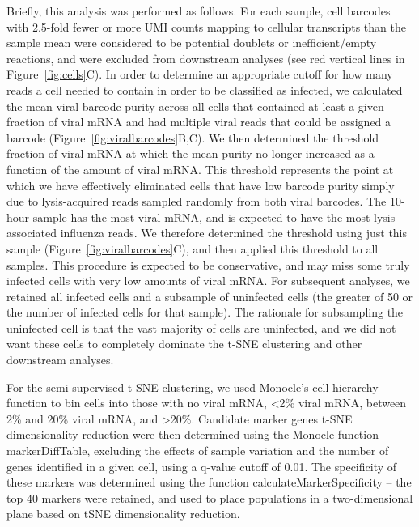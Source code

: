 \documentclass[9pt,lineno]{elife}
\begin{document}
Briefly, this analysis was performed as follows.
For each sample, cell barcodes with 2.5-fold fewer or more UMI counts mapping to cellular transcripts than the sample mean were considered to be potential doublets or inefficient/empty reactions, and were excluded from downstream analyses (see red vertical lines in Figure~\ref{fig:cells}C).
In order to determine an appropriate cutoff for how many reads a cell needed to contain in order to be classified as infected, we calculated the mean viral barcode purity across all cells that contained at least a given fraction of viral mRNA and had multiple viral reads that could be assigned a barcode (Figure~\ref{fig:viralbarcodes}B,C).
We then determined the threshold fraction of viral mRNA at which the mean purity no longer increased as a function of the amount of viral mRNA.
This threshold represents the point at which we have effectively eliminated cells that have low barcode purity simply due to lysis-acquired reads sampled randomly from both viral barcodes.
The 10-hour sample has the most viral mRNA, and is expected to have the most lysis-associated influenza reads.
We therefore determined the threshold using just this sample (Figure~\ref{fig:viralbarcodes}C), and then applied this threshold to all samples.
This procedure is expected to be conservative, and may miss some truly infected cells with very low amounts of viral mRNA.
For subsequent analyses, we retained all infected cells and a subsample of uninfected cells (the greater of 50 or the number of infected cells for that sample).
The rationale for subsampling the uninfected cell is that the vast majority of cells are uninfected, and we did not want these cells to completely dominate the t-SNE clustering and other downstream analyses.

For the semi-supervised t-SNE clustering, we used Monocle's cell hierarchy function to bin cells into those with no viral mRNA, <2\% viral mRNA, between 2\% and 20\% viral mRNA, and >20\%. 
Candidate marker genes t-SNE dimensionality reduction were then determined using the Monocle function markerDiffTable, excluding the effects of sample variation and the number of genes identified in a given cell, using a q-value cutoff of 0.01.
The specificity of these markers was determined using the function calculateMarkerSpecificity -- the top 40 markers were retained, and used to place populations in a two-dimensional plane based on tSNE dimensionality reduction.
\end{document}
